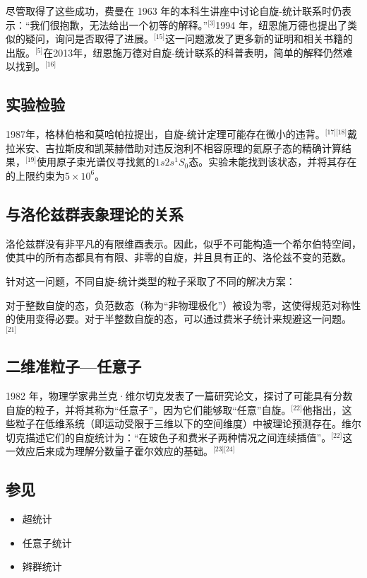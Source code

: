 尽管取得了这些成功，费曼在 1963 年的本科生讲座中讨论自旋-统计联系时仍表示：“我们很抱歉，无法给出一个初等的解释。”\(^\text{[3]}\)1994 年，纽恩施万德也提出了类似的疑问，询问是否取得了进展。\(^\text{[15]}\)这一问题激发了更多新的证明和相关书籍的出版。\(^\text{[5]}\)在2013年，纽恩施万德对自旋-统计联系的科普表明，简单的解释仍然难以找到。\(^\text{[16]}\)
\subsection{实验检验}
1987年，格林伯格和莫哈帕拉提出，自旋-统计定理可能存在微小的违背。\(^\text{[17][18]}\)戴拉米安、吉拉斯皮和凯莱赫借助对违反泡利不相容原理的氦原子态的精确计算结果，\(^\text{[19]}\)使用原子束光谱仪寻找氦的\(1s2s^1S_0\)态。实验未能找到该状态，并将其存在的上限约束为\(5\times10^{6}\)。
\subsection{与洛伦兹群表象理论的关系}  
洛伦兹群没有非平凡的有限维酉表示。因此，似乎不可能构造一个希尔伯特空间，使其中的所有态都具有有限、非零的自旋，并且具有正的、洛伦兹不变的范数。  

针对这一问题，不同自旋-统计类型的粒子采取了不同的解决方案：  

对于整数自旋的态，负范数态（称为“非物理极化”）被设为零，这使得规范对称性的使用变得必要。对于半整数自旋的态，可以通过费米子统计来规避这一问题。\(^\text{[21]}\)
\subsection{二维准粒子—任意子} 
1982 年，物理学家弗兰克·维尔切克发表了一篇研究论文，探讨了可能具有分数自旋的粒子，并将其称为“任意子”，因为它们能够取“任意”自旋。\(^\text{[22]}\)他指出，这些粒子在低维系统（即运动受限于三维以下的空间维度）中被理论预测存在。维尔切克描述它们的自旋统计为：“在玻色子和费米子两种情况之间连续插值”。\(^\text{[22]}\)这一效应后来成为理解分数量子霍尔效应的基础。\(^\text{[23][24]}\)
\subsection{参见 }
\begin{itemize}
\item 超统计
\item 任意子统计 
\item 辫群统计
\end{itemize}
